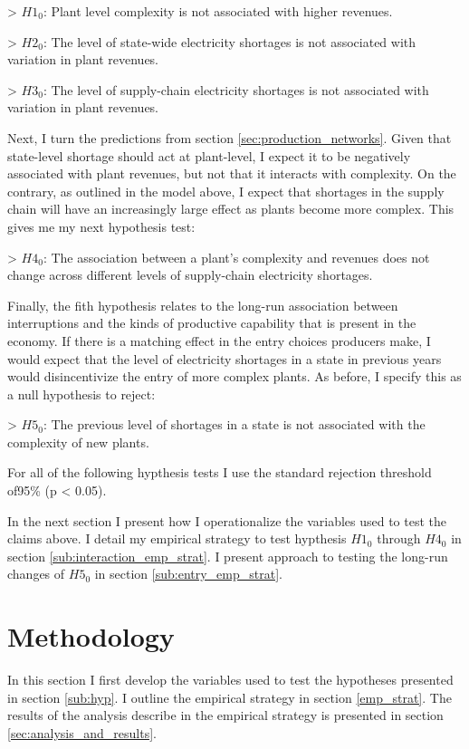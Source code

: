 \documentclass[11pt]{article}
\begin{document}
> $H1_0$: Plant level complexity is not associated with higher revenues.

> $H2_0$: The level of state-wide electricity shortages is not associated with variation in plant revenues.

> $H3_0$: The level of supply-chain electricity shortages is not associated with variation in plant revenues.

Next, I turn the predictions from section \ref{sec:production_networks}. Given that state-level shortage should act at plant-level, I expect it to be negatively associated with plant revenues, but not that it interacts with complexity. On the contrary, as outlined in the model above, I expect that shortages in the supply chain will have an increasingly large effect as plants become more complex. This gives me my next hypothesis test:

> $H4_0$: The association between a plant's complexity and revenues does not change across different levels of supply-chain electricity shortages.

Finally, the fith hypothesis relates to the long-run association between interruptions and the kinds of productive capability that is present in the economy. If there is a matching effect in the entry choices producers make, I would expect that the level of electricity shortages in a state in previous years would disincentivize the entry of more complex plants. As before, I specify this as a null hypothesis to reject:

> $H5_{0}$: The previous level of shortages in a state is not associated with the complexity of new plants.

For all of the following hypthesis tests I use the standard rejection threshold of95\% (p < 0.05).

In the next section I present how I operationalize the variables used to test the claims above. I detail my empirical strategy to test hypthesis $H1_0$ through $H4_0$ in section \ref{sub:interaction_emp_strat}. I present approach to testing the  long-run changes of $H5_0$ in section \ref{sub:entry_emp_strat}.

\newpage

\section{Methodology}%
\label{sub:methodology}
In this section I first develop the variables used to test the hypotheses presented in section \ref{sub:hyp}. I outline the empirical strategy in section \ref{emp_strat}. The results of the analysis describe in the empirical strategy is presented in section \ref{sec:analysis_and_results}.
\end{document}
